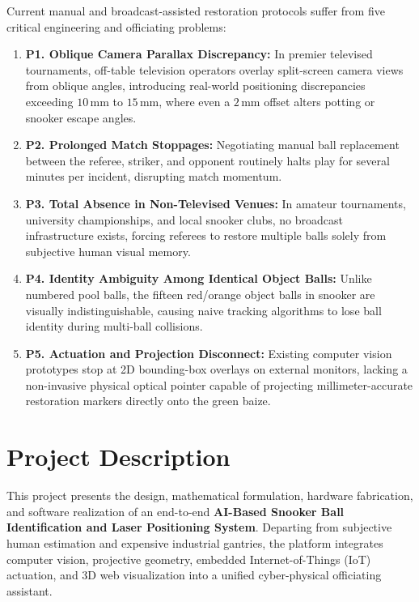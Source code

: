 Current manual and broadcast-assisted restoration protocols suffer from five critical engineering and officiating problems:
\begin{enumerate}
    \item \textbf{P1. Oblique Camera Parallax Discrepancy:} In premier televised tournaments, off-table television operators overlay split-screen camera views from oblique angles, introducing real-world positioning discrepancies exceeding $10\,\text{mm}$ to $15\,\text{mm}$, where even a $2\,\text{mm}$ offset alters potting or snooker escape angles.
    \item \textbf{P2. Prolonged Match Stoppages:} Negotiating manual ball replacement between the referee, striker, and opponent routinely halts play for several minutes per incident, disrupting match momentum.
    \item \textbf{P3. Total Absence in Non-Televised Venues:} In amateur tournaments, university championships, and local snooker clubs, no broadcast infrastructure exists, forcing referees to restore multiple balls solely from subjective human visual memory.
    \item \textbf{P4. Identity Ambiguity Among Identical Object Balls:} Unlike numbered pool balls, the fifteen red/orange object balls in snooker are visually indistinguishable, causing naive tracking algorithms to lose ball identity during multi-ball collisions.
    \item \textbf{P5. Actuation and Projection Disconnect:} Existing computer vision prototypes stop at 2D bounding-box overlays on external monitors, lacking a non-invasive physical optical pointer capable of projecting millimeter-accurate restoration markers directly onto the green baize.
\end{enumerate}

\section{Project Description}
This project presents the design, mathematical formulation, hardware fabrication, and software realization of an end-to-end \textbf{AI-Based Snooker Ball Identification and Laser Positioning System}. Departing from subjective human estimation and expensive industrial gantries, the platform integrates computer vision, projective geometry, embedded Internet-of-Things (IoT) actuation, and 3D web visualization into a unified cyber-physical officiating assistant.

